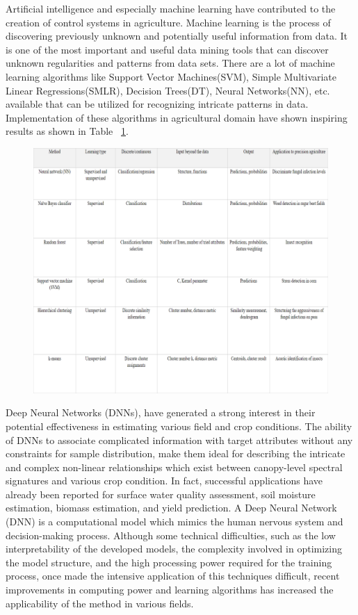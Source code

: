 Artificial intelligence and especially machine learning have contributed to the creation of control systems in agriculture. Machine learning is the process of discovering previously unknown and potentially useful information from data. It is one of the most important and useful data mining tools that can discover unknown regularities and patterns from data sets. There are a lot of machine learning algorithms like Support Vector Machines(SVM), Simple Multivariate Linear Regressions(SMLR), Decision Trees(DT), Neural Networks(NN), etc. available that can be utilized for recognizing intricate patterns in data. Implementation of these algorithms in agricultural domain have shown inspiring results as shown in Table ~\ref{tab: tab1}.
 
\begin{figure}[t]
	\includegraphics[width=1\linewidth]{extra-9}
	\centering
{} \label{tab: tab1}
\end{figure}

Deep Neural Networks (DNNs), have generated a strong interest in their potential effectiveness in estimating various field and crop conditions. The ability of DNNs to associate complicated information with target attributes without any constraints for sample distribution, make them ideal for describing the intricate and complex non-linear relationships which exist between canopy-level spectral signatures and various crop condition. In fact, successful applications have already been reported for surface water quality assessment, soil moisture estimation, biomass estimation, and yield prediction. A Deep Neural Network (DNN) is a computational model which mimics the human nervous system and decision-making process. Although some technical difficulties, such as the low interpretability of the developed models, the complexity involved in optimizing the model structure, and the high processing power required for the training process, once made the intensive application of this techniques difficult, recent improvements in computing power and learning algorithms has increased the applicability of the method in various fields.


